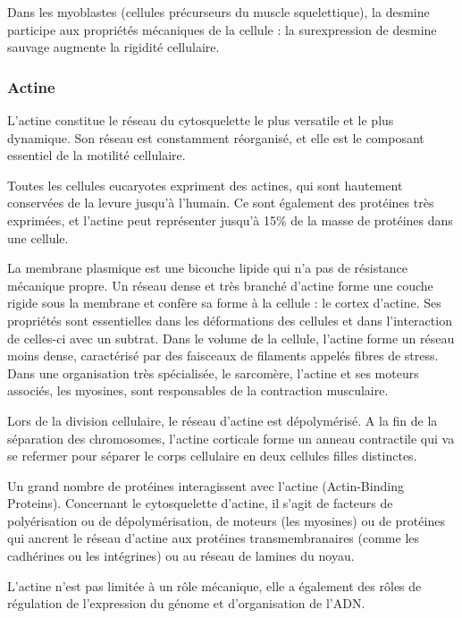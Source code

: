 \documentclass{report}
\begin{document}
Dans les myoblastes (cellules précurseurs du muscle squelettique), la desmine participe aux propriétés mécaniques de la cellule : la surexpression de desmine sauvage augmente la rigidité cellulaire. 





\subsubsection{Actine}
  
L'actine constitue le réseau du cytosquelette le plus versatile et le plus dynamique. Son réseau est constamment réorganisé, et elle est le composant essentiel de la motilité cellulaire. 

Toutes les cellules eucaryotes expriment des actines, qui sont hautement conservées de la levure jusqu'à l'humain. Ce sont également des protéines très exprimées, et l'actine peut représenter jusqu'à 15\% de la masse de protéines dans une cellule. 

La membrane plasmique est une bicouche lipide qui n'a pas de résistance mécanique propre. Un réseau dense et très branché d'actine forme une couche rigide sous la membrane et confère sa forme à la cellule : le cortex d'actine. Ses propriétés sont essentielles dans les déformations des cellules et dans l'interaction de celles-ci avec un subtrat. 
Dans le volume de la cellule, l'actine forme un réseau moins dense, caractérisé par des faisceaux de filaments appelés fibres de stress. 
Dans une organisation très spécialisée, le sarcomère, l'actine et ses moteurs associés, les myosines, sont responsables de la contraction musculaire. 

Lors de la division cellulaire, le réseau d'actine est dépolymérisé. A la fin de la séparation des chromosomes, l'actine corticale forme un anneau contractile qui va se refermer pour séparer le corps cellulaire en deux cellules filles distinctes. 

Un grand nombre de protéines interagissent avec l'actine (Actin-Binding Proteins). Concernant le cytosquelette d'actine, il s'agit de facteurs de polyérisation ou de dépolymérisation, de moteurs (les myosines) ou de protéines qui ancrent le réseau d'actine aux protéines transmembranaires (comme les cadhérines ou les intégrines) ou au réseau de lamines du noyau. 

L'actine n'est pas limitée à un rôle mécanique, elle a également des rôles de régulation de l'expression du génome et d'organisation de l'ADN. 
\end{document}
